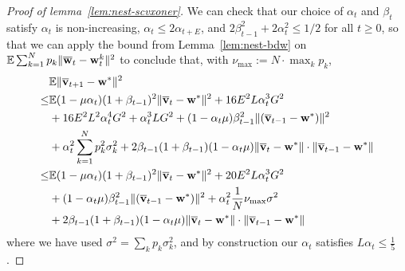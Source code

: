 \begin{proof}[Proof of lemma~\ref{lem:nest-scvxoner}]
We can check that our choice of $\alpha_t$ and $\beta_t$ satisfy $\alpha_t$ is non-increasing, $\alpha_t \leq 2\alpha_{t+E}$, and $2\beta_{t-1}^{2}+2\alpha_{t}^{2}\leq1/2$ for all $t\geq 0$, so that we can apply the bound from Lemma~\ref{lem:nest-bdw} on $\mathbb{E}\sum_{k=1}^{N}p_{k}\|{\overline{\mathbf{w}}}_{t}-{\mathbf{w}}_{t}^{k}\|^{2}$ to conclude that, with $\nu_{\max}:=N\cdot\max_{k}p_{k}$,
{\small
\begin{align*}
& \mathbb{E}\|{\overline{\mathbf{v}}}_{t+1}-{\mathbf{w}}^{\ast}\|^{2} \\
\leq &\mathbb{E}(1-\mu\alpha_{t})(1+\beta_{t-1})^{2}\|{\overline{\mathbf{v}}}_{t}-{\mathbf{w}}^{\ast}\|^{2}+16E^{2}L\alpha_{t}^{3}G^{2}\\
&+16E^{2}L^{2}\alpha_{t}^{4}G^{2}+\alpha_{t}^{3}LG^{2} +(1-\alpha_{t}\mu)\beta_{t-1}^{2}\|({\overline{\mathbf{v}}}_{t-1}-{\mathbf{w}}^{\ast})\|^{2} \\
&+\alpha_{t}^{2}\sum_{k=1}^{N}p_{k}^{2}\sigma_{k}^{2}+2\beta_{t-1}(1+\beta_{t-1})(1-\alpha_{t}\mu)\|{\overline{\mathbf{v}}}_{t}-{\mathbf{w}}^{\ast}\|\cdot\|{\overline{\mathbf{v}}}_{t-1}-{\mathbf{w}}^{\ast}\|\\
\leq& \mathbb{E}(1-\mu\alpha_{t})(1+\beta_{t-1})^{2}\|{\overline{\mathbf{v}}}_{t}-{\mathbf{w}}^{\ast}\|^{2}+20E^{2}L\alpha_{t}^{3}G^{2}\\
&+(1-\alpha_{t}\mu)\beta_{t-1}^{2}\|({\overline{\mathbf{v}}}_{t-1}-{\mathbf{w}}^{\ast})\|^{2}+\alpha_{t}^{2}\frac{1}{N}\nu_{\max}\sigma^{2}\\
&+2\beta_{t-1}(1+\beta_{t-1})(1-\alpha_{t}\mu)\|{\overline{\mathbf{v}}}_{t}-{\mathbf{w}}^{\ast}\|\cdot\|{\overline{\mathbf{v}}}_{t-1}-{\mathbf{w}}^{\ast}\|
\end{align*}
}
where we have used $\sigma^{2}=\sum_{k}p_{k}\sigma_{k}^{2}$, and by construction our $\alpha_{t}$
satisfies $L\alpha_{t}\leq\frac{1}{5}$.
\end{proof}